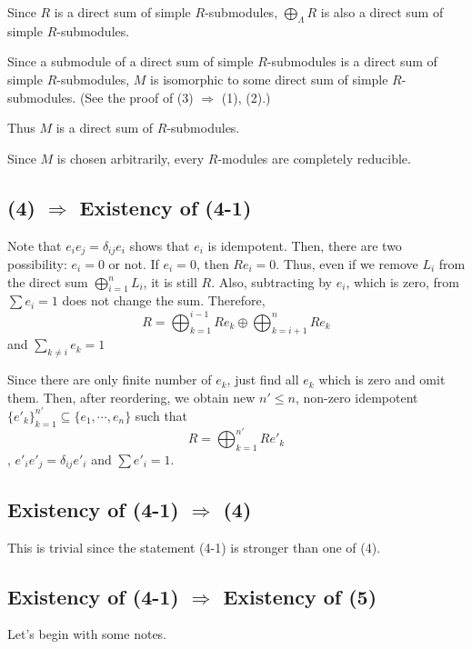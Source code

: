 Since \(R\) is a direct sum of simple \(R\)-submodules,
\(\bigoplus_\Lambda R\) is also a direct sum of simple \(R\)-submodules.

Since a submodule of a direct sum of simple \(R\)-submodules
is a direct sum of simple \(R\)-submodules,
\(M\) is isomorphic to some direct sum of simple \(R\)-submodules.
(See the proof of (3) \(\Rightarrow\) (1), (2).)

Thus \(M\) is a direct sum of \(R\)-submodules.

Since \(M\) is chosen arbitrarily,
every \(R\)-modules are completely reducible.
\qedsq

\subsection*{(4) \(\Rightarrow\) Existency of (4-1)}

Note that \(e_i e_j = \delta_{ij} e_i\) shows that \(e_i\) is idempotent.
Then, there are two possibility:
\(e_i = 0\) or not.
If \(e_i = 0\), then \(R e_i = 0\).
Thus, even if we remove \(L_i\) from the direct sum \(\bigoplus_{i=1}^n L_i\),
it is still \(R\).
Also, subtracting by \(e_i\), which is zero, from \(\sum e_i = 1\)
does not change the sum.
Therefore,
\[R = \bigoplus_{k=1}^{i-1} Re_k \oplus \bigoplus_{k=i+1}^{n} Re_k\]
and \(\sum_{k \neq i} e_k = 1\)

Since there are only finite number of \(e_k\),
just find all \(e_k\) which is zero and omit them.
Then, after reordering,
we obtain new \(n' \le n\), non-zero idempotent
\(\{e'_k\}_{k=1}^{n'} \subseteq \{e_1, \cdots, e_n\}\)
such that
\[R = \bigoplus_{k=1}^{n'} Re'_k\],
\(e'_ie'_j = \delta_{ij}e'_i\) and \(\sum e'_i = 1\).
\qedsq

\subsection*{Existency of (4-1) \(\Rightarrow\) (4)}
This is trivial since the statement (4-1) is stronger than one of (4).
\qedsq

\subsection*{Existency of (4-1) \(\Rightarrow\) Existency of (5)}

Let's begin with some notes.

